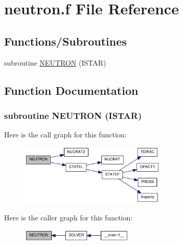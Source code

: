 \hypertarget{neutron_8f}{
\section{neutron.f File Reference}
\label{neutron_8f}
}
\subsection*{Functions/Subroutines}
\begin{DoxyCompactItemize}
\item 
subroutine \hyperlink{neutron_8f_a89ebfd2aa871c64527ac202c5c7ad218}{NEUTRON} (ISTAR)
\end{DoxyCompactItemize}


\subsection{Function Documentation}
\hypertarget{neutron_8f_a89ebfd2aa871c64527ac202c5c7ad218}{
\subsubsection[{NEUTRON}]{\setlength{\rightskip}{0pt plus 5cm}subroutine NEUTRON (ISTAR)}}
\label{neutron_8f_a89ebfd2aa871c64527ac202c5c7ad218}


Here is the call graph for this function:\nopagebreak
\begin{figure}[H]
\begin{center}
\leavevmode
\includegraphics[width=199pt]{neutron_8f_a89ebfd2aa871c64527ac202c5c7ad218_cgraph}
\end{center}
\end{figure}


Here is the caller graph for this function:\nopagebreak
\begin{figure}[H]
\begin{center}
\leavevmode
\includegraphics[width=153pt]{neutron_8f_a89ebfd2aa871c64527ac202c5c7ad218_icgraph}
\end{center}
\end{figure}
